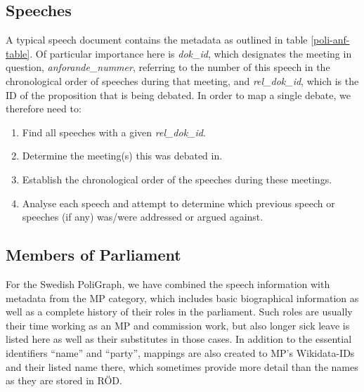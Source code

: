 \subsection{Speeches}

A typical speech document contains the metadata as outlined in table \ref{poli-anf-table}. Of particular importance here is \emph{dok\_id}, which designates the meeting in question, \emph{anforande\_nummer}, referring to the number of this speech in the chronological order of speeches during that meeting, and \emph{rel\_dok\_id}, which is the ID of the proposition that is being debated. In order to map a single debate, we therefore need to:

\begin{enumerate}
    \item Find all speeches with a given \emph{rel\_dok\_id}.
    \item Determine the meeting(s) this was debated in.
    \item Establish the chronological order of the speeches during these meetings.
    \item Analyse each speech and attempt to determine which previous speech or speeches (if any) was/were addressed or argued against.
\end{enumerate}

\subsection{Members of Parliament}
\label{sec:mp}

For the Swedish PoliGraph, we have combined the speech information with metadata from the MP category, which includes basic biographical information as well as a complete history of their roles in the parliament. Such roles are usually their time working as an MP and commission work, but also longer sick leave is listed here as well as their substitutes in those cases. In addition to the essential identifiers ``name'' and ``party'', mappings are also created to MP's Wikidata-IDs and their listed name there, which sometimes provide more detail than the names as they are stored in RÖD.

